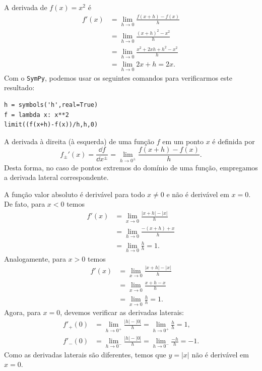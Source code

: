\begin{ex}
  A derivada de $f(x) = x^2$ é
  \begin{align}
    f'(x) &= \lim_{h\to 0} \frac{f(x+h)-f(x)}{h}\\
          &= \lim_{h\to 0} \frac{(x+h)^2 - x^2}{h}\\
          &= \lim_{h\to 0} \frac{x^2+2xh+h^2-x^2}{h}\\
          &= \lim_{h\to 0} 2x+h = 2x.
  \end{align}
  \ifispython
  Com o \verb+SymPy+, podemos usar os seguintes comandos para verificarmos este resultado:
\begin{verbatim}
h = symbols('h',real=True)
f = lambda x: x**2
limit((f(x+h)-f(x))/h,h,0)
\end{verbatim}
  \fi
\end{ex}

\begin{obs}
  A derivada à direita (à esquerda) de uma função $f$ em um ponto $x$ é definida por
  \begin{equation}
    f_{\pm}'(x) = \frac{\dd f}{\dd x^{\pm}} = \lim_{h\to 0^\pm} \frac{f(x+h)-f(x)}{h}.
  \end{equation}
  Desta forma, no caso de pontos extremos do domínio de uma função, empregamos a derivada lateral correspondente.
\end{obs}

\begin{ex}
  A função valor absoluto é derivável para todo $x\neq 0$ e não é derivável em $x=0$. De fato, para $x<0$ temos
  \begin{align}
    f'(x) &= \lim_{x\to 0} \frac{|x+h|-|x|}{h}\\
          &= \lim_{h\to 0} \frac{-(x+h)+x}{h}\\
          &= \lim_{h\to 0} \frac{h}{h} = 1.
  \end{align}
  Analogamente, para $x>0$ temos
  \begin{align}
    f'(x) &= \lim_{x\to 0} \frac{|x+h|-|x|}{h}\\
          &= \lim_{x\to 0} \frac{x+h-x}{h}\\
          &= \lim_{x\to 0} \frac{h}{h} = 1.
  \end{align}
  Agora, para $x=0$, devemos verificar as derivadas laterais:
  \begin{align}
    f'_+(0) &= \lim_{h\to 0^+} \frac{|h|-|0|}{h} = \lim_{h\to 0^+} \frac{h}{h} = 1,\\
    f'_-(0) &= \lim_{h\to 0^-} \frac{|h|-|0|}{h} = \lim_{h\to 0^-} \frac{-h}{h} = -1.
  \end{align}
  Como as derivadas laterais são diferentes, temos que $y = |x|$ não é derivável em $x=0$.
\end{ex}

